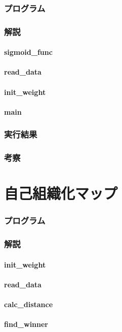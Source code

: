 \documentclass{jsarticle}
\begin{document}
\section{プログラム}
\section{解説}
\subsection{sigmoid\_func}
\subsection{read\_data}
\subsection{init\_weight}
\subsection{main}
\section{実行結果}
\section{考察}

\part{自己組織化マップ}
\section{プログラム}
\section{解説}
\subsection{init\_weight}
\subsection{read\_data}
\subsection{calc\_distance}
\subsection{find\_winner}
\end{document}
